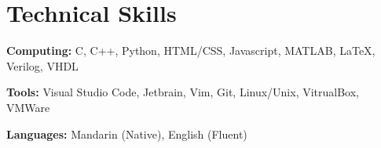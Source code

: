 \documentclass[letterpaper,11pt]{article}
\makeatletter
\newcommand{\resumeOrganizationHeading}[4]{
  \vspace{-2pt}\item
    \begin{tabular*}{0.97\textwidth}[t]{l@{\extracolsep{\fill}}r}
      \textbf{#1} & \textit{\small #2} \\
      \textit{\small#3}
    \end{tabular*}\vspace{-7pt}
}
\newcommand{\resumeSubHeadingListStart}{\begin{itemize}[leftmargin=0.15in, label={}]}
\newcommand{\resumeSubHeadingListEnd}{\end{itemize}}
\makeatother
\begin{document}
\section{Technical Skills}
\vspace{2pt}
\resumeSubHeadingListStart
  \small{\item{
	  \textbf{Computing: }{C, C++, Python, HTML/CSS, Javascript, MATLAB, LaTeX, Verilog, VHDL } \\ \vspace{3pt}
	  
	  \textbf{Tools: }{Visual Studio Code, Jetbrain, Vim, Git, Linux/Unix, VitrualBox, VMWare} \\ \vspace{3pt}
	  
	  \textbf{Languages: }{Mandarin (Native), English (Fluent)}
	  
  }}
\resumeSubHeadingListEnd


    
    




    
    



\end{document}
